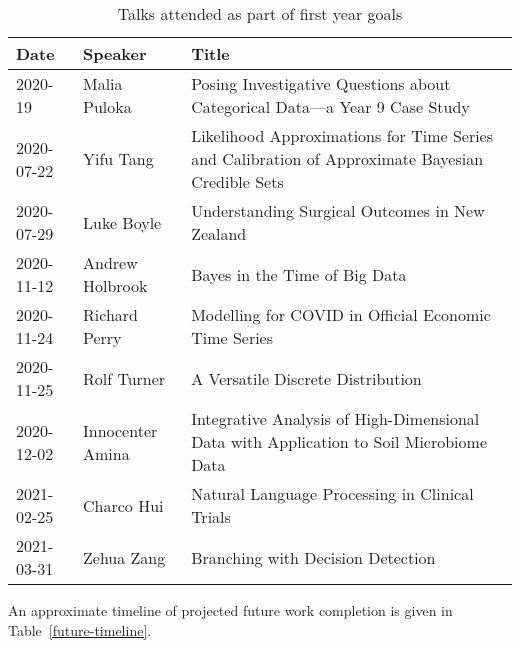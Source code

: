 \begin{table}%
        \centering
        \begin{tabularx}{\textwidth}{llX}
                \toprule
                Date & Speaker & Title\\
                \midrule
                2020-19 & Malia Puloka & Posing Investigative Questions about Categorical Data---a Year 9 Case Study\\
                2020-07-22 & Yifu Tang & Likelihood Approximations for Time Series and Calibration of Approximate Bayesian Credible Sets\\
                2020-07-29 & Luke Boyle & Understanding Surgical Outcomes in New Zealand\\
                2020-11-12 & Andrew Holbrook & Bayes in the Time of Big Data\\
                2020-11-24 & Richard Perry & Modelling for COVID in Official Economic Time Series\\
                2020-11-25 & Rolf Turner & A Versatile Discrete Distribution\\
                2020-12-02 & Innocenter Amina & Integrative Analysis of High-Dimensional Data with Application to Soil Microbiome Data\\
                2021-02-25 & Charco Hui & Natural Language Processing in Clinical Trials\\
                2021-03-31 & Zehua Zang & Branching with Decision Detection\\
                \bottomrule
        \end{tabularx}
        \caption{\label{talks}Talks attended as part of first year goals}
\end{table}

An approximate timeline of projected future work completion is given in Table~\ref{future-timeline}.

